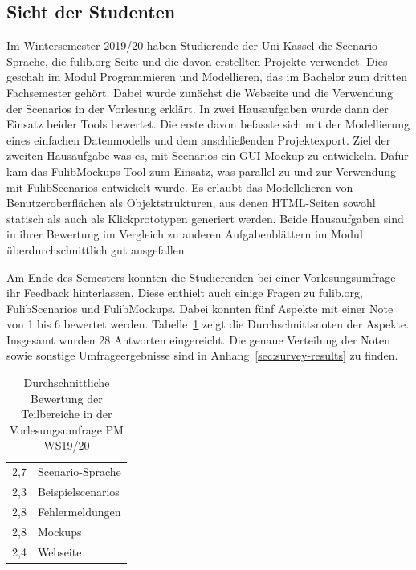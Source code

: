 \subsection{Sicht der Studenten}\label{subsec:students-view}

Im Wintersemester 2019/20 haben Studierende der Uni Kassel die Scenario-Sprache, die fulib.org-Seite und die davon erstellten Projekte verwendet.
Dies geschah im Modul Programmieren und Modellieren, das im Bachelor zum dritten Fachsemester gehört.
Dabei wurde zunächst die Webseite und die Verwendung der Scenarios in der Vorlesung erklärt.
In zwei Hausaufgaben wurde dann der Einsatz beider Tools bewertet.
Die erste davon befasste sich mit der Modellierung eines einfachen Datenmodells und dem anschließenden Projektexport.
Ziel der zweiten Hausaufgabe was es, mit Scenarios ein GUI-Mockup zu entwickeln.
Dafür kam das FulibMockups-Tool zum Einsatz, was parallel zu und zur Verwendung mit FulibScenarios entwickelt wurde.
Es erlaubt das Modellelieren von Benutzeroberflächen als Objektstrukturen,
aus denen HTML-Seiten sowohl statisch als auch als Klickprototypen generiert werden.
Beide Hausaufgaben sind in ihrer Bewertung im Vergleich zu anderen Aufgabenblättern im Modul überdurchschnittlich gut ausgefallen.

Am Ende des Semesters konnten die Studierenden bei einer Vorlesungsumfrage ihr Feedback hinterlassen.
Diese enthielt auch einige Fragen zu fulib.org, FulibScenarios und FulibMockups.
Dabei konnten fünf Aspekte mit einer Note von 1 bis 6 bewertet werden.
Tabelle~\ref{tab:survey-results} zeigt die Durchschnittsnoten der Aspekte.
Insgesamt wurden 28 Antworten eingereicht.
Die genaue Verteilung der Noten sowie sonstige Umfrageergebnisse sind in Anhang~\ref{sec:survey-results} zu finden.

\begin{table}
    \caption{Durchschnittliche Bewertung der Teilbereiche in der Vorlesungsumfrage PM WS19/20}
    \label{tab:survey-results}
    \centering
    \begin{tabular}{rl}
        \toprule
        2,7 & Scenario-Sprache \\
        2,3 & Beispielscenarios \\
        2,8 & Fehlermeldungen \\
        2,8 & Mockups \\
        2,4 & Webseite \\
        \bottomrule
    \end{tabular}
\end{table}


